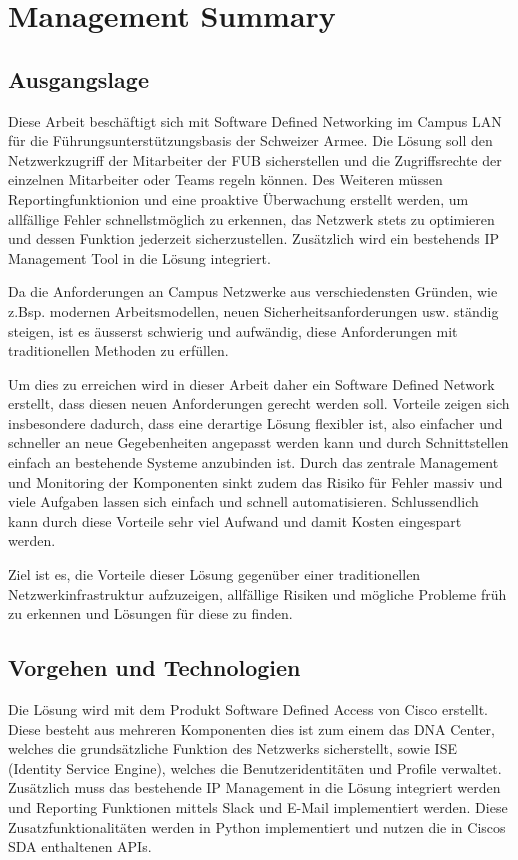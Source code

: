 \section{Management Summary}

\subsection{Ausgangslage}
Diese Arbeit beschäftigt sich mit Software Defined Networking im Campus LAN für die Führungsunterstützungsbasis der Schweizer Armee. Die Lösung soll den Netzwerkzugriff der Mitarbeiter der FUB sicherstellen und die Zugriffsrechte der einzelnen Mitarbeiter oder Teams regeln können. 
Des Weiteren müssen Reportingfunktionion und eine proaktive Überwachung erstellt werden, um allfällige Fehler schnellstmöglich zu erkennen, das Netzwerk stets zu optimieren und dessen Funktion jederzeit sicherzustellen.
Zusätzlich wird ein bestehends IP Management Tool in die Lösung integriert.

Da die Anforderungen an Campus Netzwerke aus verschiedensten Gründen, wie z.Bsp. modernen Arbeitsmodellen, neuen Sicherheitsanforderungen usw. ständig steigen, ist es äusserst schwierig und aufwändig, diese Anforderungen mit traditionellen Methoden zu erfüllen. 

Um dies zu erreichen wird in dieser Arbeit daher ein Software Defined Network erstellt, dass diesen neuen Anforderungen gerecht werden soll. Vorteile zeigen sich insbesondere dadurch, dass eine derartige Lösung flexibler ist, also einfacher und schneller an neue Gegebenheiten angepasst werden kann und durch Schnittstellen einfach an bestehende Systeme anzubinden ist. Durch das zentrale Management und Monitoring der Komponenten sinkt zudem das Risiko für Fehler massiv und viele Aufgaben lassen sich einfach und schnell automatisieren.
Schlussendlich kann durch diese Vorteile sehr viel Aufwand und damit Kosten eingespart werden.

Ziel ist es, die Vorteile dieser Lösung gegenüber einer traditionellen Netzwerkinfrastruktur aufzuzeigen, allfällige Risiken und mögliche Probleme früh zu erkennen und Lösungen für diese zu finden. 
\subsection{Vorgehen und Technologien}
Die Lösung wird mit dem Produkt Software Defined Access von Cisco erstellt. Diese besteht aus mehreren Komponenten dies ist zum einem das DNA Center, welches die grundsätzliche Funktion des Netzwerks sicherstellt, sowie ISE (Identity Service Engine), welches die Benutzeridentitäten und Profile verwaltet.
Zusätzlich muss das bestehende IP Management in die Lösung integriert werden und Reporting Funktionen mittels Slack und E-Mail implementiert werden. Diese Zusatzfunktionalitäten werden in Python implementiert und nutzen die in Ciscos SDA enthaltenen APIs.
